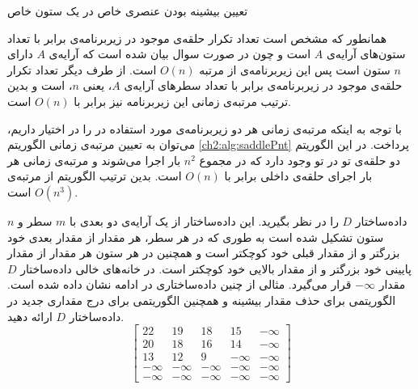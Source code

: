 \begin{algorithm}
\caption{تعیین بیشینه بودن عنصری خاص در یک ستون خاص}\label{ch2:alg:maxInCol}
\begin{latin}
\begin{algorithmic}[1]
						\State	\Return {}
				\EndIf
		\EndFor
		\State	\Return {}
\EndFunction
\end{algorithmic}
\end{latin}
\end{algorithm}

همانطور که مشخص است تعداد تکرار حلقه‌ی موجود در زیربرنامه‌ی {} برابر با تعداد ستون‌های آرایه‌ی {$A$} است و چون در صورت سوال بیان شده است که آرایه‌ی {$A$} دارای {$n$} ستون است پس این زیربرنامه‌ی از مرتبه {$O(n)$} است. از طرف دیگر تعداد تکرار حلقه‌ی موجود در زیربرنامه‌ی {} برابر با تعداد سطرهای آرایه‌ی {$A$}، یعنی {$n$}، است و بدین ترتیب مرتبه‌ی زمانی این زیربرنامه نیز برابر با {$O(n)$} است.

با توجه به اینکه مرتبه‌ی زمانی هر دو زیربرنامه‌ی مورد استفاده در {} را در اختیار داریم، می‌توان به تعیین مرتبه‌ی زمانی الگوریتم {\ref{ch2:alg:saddlePnt}} پرداخت. در این الگوریتم دو حلقه‌ی تو در تو وجود دارد که در مجموع {$n^2$} بار اجرا می‌شوند و مرتبه‌ی زمانی هر بار اجرای حلقه‌ی داخلی برابر با {$O(n)$} است. بدین ترتیب الگوریتم {} از مرتبه‌ی {$O(n^3)$} است.

 داده‌‌ساختار {$D$} را در نظر بگیرید. این داده‌ساختار از یک آرایه‌ی دو بعدی با {$m$} سطر و {$n$} ستون تشکیل ‌شده است به طوری که در هر سطر، هر مقدار از مقدار بعدی خود بزرگتر و از مقدار قبلی خود کوچکتر است و همچنین در هر ستون هر مقدار از مقدار پایینی خود بزرگتر و از مقدار بالایی خود کوچکتر است. در خانه‌های خالی داده‌ساختار {$D$} مقدار {$-\infty$} قرار می‌گیرد. مثالی از چنین داده‌ساختاری در ادامه نشان داده شده است.  الگوریتمی برای حذف مقدار بیشینه و همچنین الگوریتمی برای درج مقداری جدید در داده‌ساختار {$D$} ارائه دهید.
$$
\begin{bmatrix}
22 & 19 & 18 & 15 & -\infty\\
20 & 18 & 16 & 14 & -\infty\\
13 & 12 & 9 & -\infty & -\infty\\
-\infty & -\infty & -\infty & -\infty & -\infty\\
-\infty & -\infty & -\infty & -\infty & -\infty
\end{bmatrix}
$$


